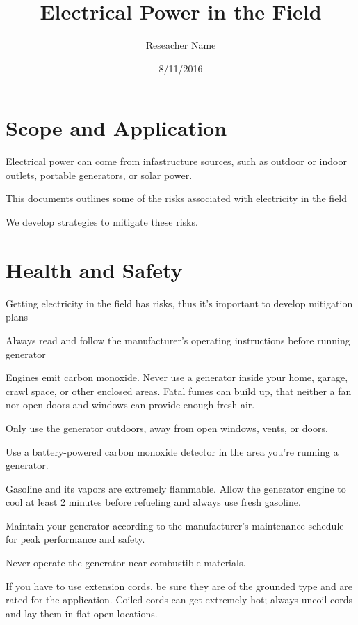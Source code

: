 \documentclass[12pt]{../SOP2}
\title{Electrical Power in the Field}
\date{8/11/2016}
\author{Reseacher Name}
\begin{document}


\maketitle

\section{Scope and Application}

\NP Electrical power can come from infastructure sources, such as outdoor or indoor outlets, portable generators, or solar power.

\NP This documents outlines some of the risks associated with electricity in the field

\NP We develop strategies to mitigate these risks.

\section{Health and Safety}

\NP Getting electricity in the field has risks, thus it's important to develop mitigation plans

\NP Always read and follow the manufacturer's operating instructions before running
generator

\NP Engines emit carbon monoxide. Never use a generator inside your home, garage, crawl space, or other enclosed areas. Fatal fumes can build up, that neither a fan
nor open doors and windows can provide enough fresh air.

\NP Only use the generator outdoors, away from open windows, vents, or doors.

\NP Use a battery-powered carbon monoxide detector in the area you're running a generator.

\NP Gasoline and its vapors are extremely flammable. Allow the generator engine to cool at least 2 minutes before refueling and always use fresh gasoline. 

\NP Maintain your generator according to the manufacturer’s maintenance schedule for peak performance and safety.

\NP Never operate the generator near combustible materials.

\NP If you have to use extension cords, be sure they are of the grounded type and are rated for the application. Coiled cords can get extremely hot; always uncoil cords and lay them in flat open locations.
\end{document}
